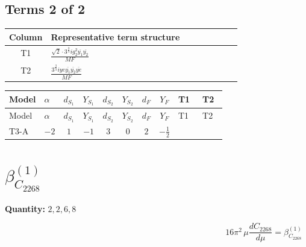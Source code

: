 \documentclass[8pt]{article}
\begin{document}
\begin{landscape}
\subsection*{Terms 2 of 2}
\begin{center}
\begin{tabular}{@{}c >{\raggedright\arraybackslash}p{0.82\linewidth}@{}}
\toprule
Column & Representative term structure \\
\midrule
T1 & \(\displaystyle \frac{\sqrt{2} \cdot 3^{\frac{3}{4}} i g_{2}^{2} \overline{y_{1}} \overline{y_{2}}}{MF}\) \\
\midrule
T2 & \(\displaystyle \frac{3^{\frac{3}{4}} i ye \overline{y_{1}} \overline{y_{2}} \overline{ye}}{MF}\) \\
\midrule
\bottomrule
\end{tabular}
\end{center}
\smallskip
\tiny
\begin{longtable}{@{}llcccccc >{\raggedright\arraybackslash}p{0.21\linewidth} >{\raggedright\arraybackslash}p{0.21\linewidth}@{}}
\toprule
Model & $\alpha$ & $d_{S_1}$ & $Y_{S_1}$ & $d_{S_2}$ & $Y_{S_2}$ & $d_F$ & $Y_F$ & T1 & T2 \\
\midrule
\endfirsthead
\toprule
Model & $\alpha$ & $d_{S_1}$ & $Y_{S_1}$ & $d_{S_2}$ & $Y_{S_2}$ & $d_F$ & $Y_F$ & T1 & T2 \\
\midrule
\endhead
T3-A & $-2$ & $1$ & $-1$ & $3$ & $0$ & $2$ & $-\frac{1}{2}$ & \scriptsize\adjustbox{max width=\linewidth}{$\begin{gathered} - \frac{\sqrt{2} \cdot 3^{\frac{3}{4}} i g_{2}^{2} \overline{y_{1}} \overline{y_{2}}}{3 MF}\end{gathered}$} & \scriptsize\adjustbox{max width=\linewidth}{$\begin{gathered} \frac{3^{\frac{3}{4}} i ye \overline{y_{1}} \overline{y_{2}} \overline{ye}}{12 MF}\end{gathered}$} \\
\midrule
\bottomrule
\end{longtable}
\clearpage
\section*{$\beta_{C_{2268}}^{(1)}$}
\noindent\textbf{Quantity: }$\mathrm{2,2,6,8}$\par\smallskip
\[16\pi^2\,\mu\frac{d C_{2268}}{d\mu}=\beta_{C_{2268}}^{(1)}\]

\end{landscape}
\end{document}
